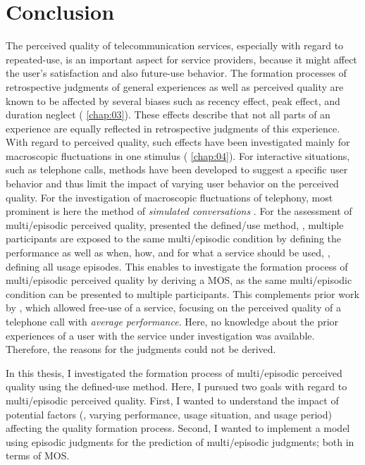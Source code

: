 \chapter{Conclusion}\label{chap:discussion}
The perceived quality of telecommunication services, especially with regard to repeated-use, is an important aspect for service providers, because it might affect the user's satisfaction and also future-use behavior.
The formation processes of retrospective judgments of general experiences as well as perceived quality are known to be affected by several biases such as recency effect, peak effect, and duration neglect (\cf{} \autoref{chap:03}).
These effects describe that not all parts of an experience are equally reflected in retrospective judgments of this experience.
With regard to perceived quality, such effects have been investigated mainly for macroscopic fluctuations in one stimulus (\cf{} \autoref{chap:04}).
For interactive situations, such as telephone calls, methods have been developed to suggest a specific user behavior and thus limit the impact of varying user behavior on the perceived quality.
For the investigation of macroscopic fluctuations of telephony, most prominent is here the method of \emph{simulated conversations} \citep{weiss_modeling_2009}.
For the assessment of multi\-/episodic perceived quality, \citet{moller_single-call_2011} presented the defined\-/use method, \ie, multiple participants are exposed to the same multi\-/episodic condition by defining the performance as well as when, how, and for what a service should be used, \ie, defining all usage episodes.
This enables to investigate the formation process of multi\-/episodic perceived quality by deriving a \ac{MOS}, as the same multi\-/episodic condition can be presented to multiple participants.
This complements prior work by \citet{duncanson_average_1969}, which allowed free-use of a service, focusing on the perceived quality of a telephone call with \emph{average performance}.
Here, no knowledge about the prior experiences of a user with the service under investigation was available.
Therefore, the reasons for the judgments could not be derived.

In this thesis, I investigated the formation process of multi\-/episodic perceived quality using the  defined-use method.
Here, I pursued two goals with regard to multi\-/episodic perceived quality.
First, I wanted to understand the impact of potential factors (\ie, varying performance, usage situation, and usage period) affecting the quality formation process.
Second, I wanted to implement a model using episodic judgments for the prediction of multi\-/episodic judgments; both in terms of \ac{MOS}.

